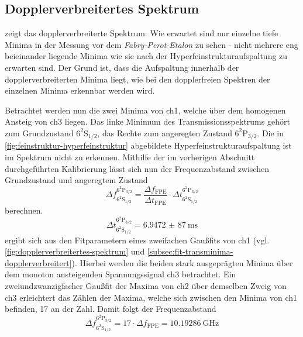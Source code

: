 \documentclass[../bericht.tex]{subfiles}
\begin{document}
      \subsection{Dopplerverbreitertes Spektrum}

         zeigt das dopplerverbreiterte Spektrum. Wie erwartet sind nur einzelne tiefe Minima in der Messung vor dem \textit{Fabry-Perot-Etalon} zu sehen - nicht mehrere eng beieinander liegende Minima wie sie nach der Hyperfeinstrukturaufspaltung zu erwarten sind. Der Grund ist, dass die Aufspaltung innerhalb der dopplerverbreiterten Minima liegt, wie bei den dopplerfreien Spektren der einzelnen Minima erkennbar werden wird.

        Betrachtet werden nun die zwei Minima von ch1, welche \"uber dem homogenen Ansteig von ch3 liegen. Das linke Minimum des Transmissionsspektrums geh\"ort zum Grundzustand $\mathrm{6^2S_{1/2}}$, das Rechte zum angeregten Zustand $\mathrm{6^2P_{3/2}}$. Die in \cref{fig:feinstruktur-hyperfeinstruktur} abgebildete Hyperfeinstrukturaufspaltung ist im Spektrum nicht zu erkennen. Mithilfe der im vorherigen Abschnitt durchgef\"uhrten Kalibrierung l\"asst sich nun der Frequenzabstand zwischen Grundzustand und angeregtem Zustand
        \begin{equation*}
          \Delta f_\mathrm{6^2S_{1/2}}^\mathrm{6^2P_{3/2}} = \frac{\Delta f_\mathrm{FPE}}{\Delta t_\mathrm{FPE}}\cdot \Delta t_\mathrm{6^2S_{1/2}}^\mathrm{6^2P_{3/2}}
        \end{equation*}
        berechnen.
        \begin{equation*}
          \Delta t_\mathrm{6^2S_{1/2}}^\mathrm{6^2P_{3/2}}= \SI{6,9472(87)}{\milli\second}
        \end{equation*}
        ergibt sich aus den Fitparametern eines zweifachen Gau\ss{}fits von ch1 (vgl. \cref{fig:dopplerverbreitertes-spektrum} und \cref{subsec:fit-transminima-dopplerverbreitert}). Hierbei werden die beiden stark ausgepr\"agten Minima \"uber dem monoton ansteigenden Spannungssignal ch3 betrachtet. Ein zweiundzwanzigfacher Gau\ss{}fit der Maxima von ch2 \"uber demselben Zweig von ch3 erleichtert das Z\"ahlen der Maxima, welche sich zwischen den Minima von ch1 befinden, 17 an der Zahl. Damit folgt der Frequenzabstand
        \begin{equation*}
          \Delta f_\mathrm{6^2S_{1/2}}^\mathrm{6^2P_{3/2}} = 17 \cdot \Delta f_\mathrm{FPE} = \SI{10,19286}{\giga\hertz}
        \end{equation*}
\end{document}
